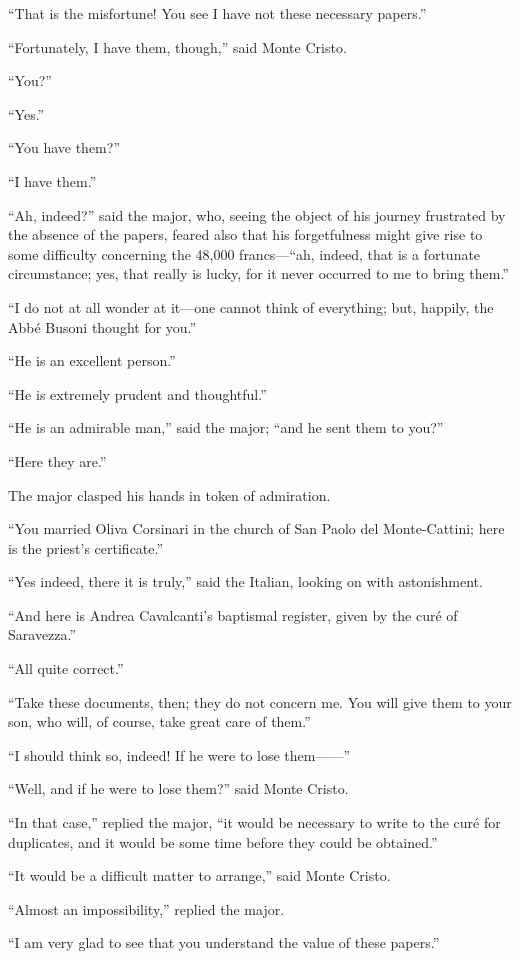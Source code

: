 “That is the misfortune! You see I have not these necessary papers.”

“Fortunately, I have them, though,” said Monte Cristo.

“You?”

“Yes.”

“You have them?”

“I have them.”

“Ah, indeed?” said the major, who, seeing the object of his journey
frustrated by the absence of the papers, feared also that his
forgetfulness might give rise to some difficulty concerning the 48,000
francs—“ah, indeed, that is a fortunate circumstance; yes, that really
is lucky, for it never occurred to me to bring them.”

“I do not at all wonder at it—one cannot think of everything; but,
happily, the Abbé Busoni thought for you.”

“He is an excellent person.”

“He is extremely prudent and thoughtful.”

“He is an admirable man,” said the major; “and he sent them to you?”

“Here they are.”

The major clasped his hands in token of admiration.

“You married Oliva Corsinari in the church of San Paolo del
Monte-Cattini; here is the priest’s certificate.”

“Yes indeed, there it is truly,” said the Italian, looking on with
astonishment.

“And here is Andrea Cavalcanti’s baptismal register, given by the curé
of Saravezza.”

“All quite correct.”

“Take these documents, then; they do not concern me. You will give them
to your son, who will, of course, take great care of them.”

“I should think so, indeed! If he were to lose them——”

“Well, and if he were to lose them?” said Monte Cristo.

“In that case,” replied the major, “it would be necessary to write to
the curé for duplicates, and it would be some time before they could be
obtained.”

“It would be a difficult matter to arrange,” said Monte Cristo.

“Almost an impossibility,” replied the major.

“I am very glad to see that you understand the value of these papers.”

